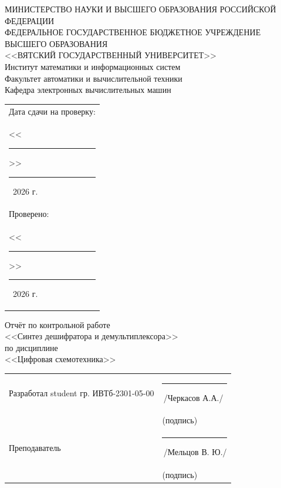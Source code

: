 \documentclass[oneside,a4paper,14pt]{extarticle}
\begin{document}
\newpage
\thispagestyle{empty}
\begin{center}
  МИНИСТЕРСТВО НАУКИ И ВЫСШЕГО ОБРАЗОВАНИЯ РОССИЙСКОЙ ФЕДЕРАЦИИ\\
  ФЕДЕРАЛЬНОЕ ГОСУДАРСТВЕННОЕ БЮДЖЕТНОЕ УЧРЕЖДЕНИЕ ВЫСШЕГО ОБРАЗОВАНИЯ\\
  <<ВЯТСКИЙ ГОСУДАРСТВЕННЫЙ УНИВЕРСИТЕТ>>\\
  Институт математики и информационных систем\\
  Факультет автоматики и вычислительной техники\\
  Кафедра электронных вычислительных машин
\end{center}
\vspace{10mm}

\hfill
\begin{tabular}{l}
  \footnotesize Дата сдачи на проверку:                                          \\
  \footnotesize <<\rule[-1mm]{5mm}{0.10mm}\/>>\rule[-1mm]{20mm}{0.10mm}\ 2026 г. \\
  \footnotesize Проверено:                                                       \\
  \footnotesize <<\rule[-1mm]{5mm}{0.10mm}\/>>\rule[-1mm]{20mm}{0.10mm}\ 2026 г. \\
\end{tabular}
\vfill

\begin{center}
  Отчёт по контрольной работе\\
  <<Синтез дешифратора и демультиплексора>>\\
  по дисциплине\\
  <<Цифровая схемотехника>>\\
\end{center}
\vspace{25mm}
\noindent
\begin{tabular}{ll}
  Разработал student гр. ИВТб-2301-05-00 & \hspace{20mm}\rule[-1mm]{30mm}{0.10mm}\,/Черкасов А.А./ \\
                                 & \hspace{27.5mm}\footnotesize(подпись)                   \\
  Преподаватель                  & \hspace{20mm}\rule[-1mm]{30mm}{0.10mm}\,/Мельцов В. Ю./  \\
                                 & \hspace{27.5mm}\footnotesize(подпись)                   \\
\end{tabular}
\end{document}
